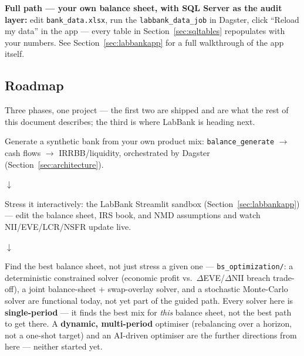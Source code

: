 \documentclass[11pt,a4paper]{article}
\begin{document}
\textbf{Full path --- your own balance sheet, with SQL Server as the audit layer:}
edit \texttt{bank\_data.xlsx}, run the \texttt{labbank\_data\_job} in Dagster,
click ``Reload my data'' in the app --- every table in
Section~\ref{sec:sqltables} repopulates with your numbers. See
Section~\ref{sec:labbankapp} for a full walkthrough of the app itself.

\subsection{Roadmap}
Three phases, one project --- the first two are shipped and are what the rest
of this document describes; the third is where LabBank is heading next.

\begin{pitchbox}
Generate a synthetic bank from your own product mix: \texttt{balance\_generate}
$\rightarrow$ cash flows $\rightarrow$ IRRBB/liquidity, orchestrated by
Dagster (Section~\ref{sec:architecture}).
\end{pitchbox}

\begin{center}\Large$\downarrow$\end{center}

\begin{pitchbox}
Stress it interactively: the LabBank Streamlit sandbox
(Section~\ref{sec:labbankapp}) --- edit the balance sheet, IRS book, and NMD
assumptions and watch NII/EVE/LCR/NSFR update live.
\end{pitchbox}

\begin{center}\Large$\downarrow$\end{center}

\begin{pitchbox}
Find the best balance sheet, not just stress a given one ---
\texttt{bs\_optimization/}: a deterministic constrained solver (economic
profit vs.\ $\Delta$EVE/$\Delta$NII breach trade-off), a joint
balance-sheet + swap-overlay solver, and a stochastic Monte-Carlo solver are
functional today, not yet part of the guided path. Every solver here is
\textbf{single-period} --- it finds the best mix for \textit{this} balance
sheet, not the best path to get there. A \textbf{dynamic, multi-period}
optimiser (rebalancing over a horizon, not a one-shot target) and an
AI-driven optimiser are the further directions from here --- neither started
yet.
\end{pitchbox}
\end{document}
